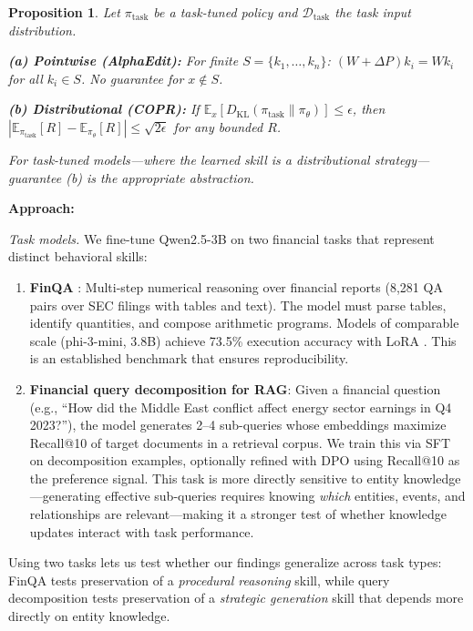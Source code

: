 \documentclass{article}
\newtheorem{proposition}{Proposition}
\begin{document}
\begin{proposition}
Let $\pi_{\text{task}}$ be a task-tuned policy and $\mathcal{D}_{\text{task}}$ the task input distribution.

\textbf{(a) Pointwise (AlphaEdit):} For finite $S = \{k_1, \ldots, k_n\}$: $(W + \Delta P)k_i = Wk_i$ for all $k_i \in S$. No guarantee for $x \notin S$.

\textbf{(b) Distributional (COPR):} If $\mathbb{E}_{x}[D_{\mathrm{KL}}(\pi_{\text{task}} \| \pi_\theta)] \leq \epsilon$, then $|\mathbb{E}_{\pi_{\text{task}}}[R] - \mathbb{E}_{\pi_\theta}[R]| \leq \sqrt{2\epsilon}$ for any bounded $R$.

For task-tuned models---where the learned skill is a distributional strategy---guarantee (b) is the appropriate abstraction.
\end{proposition}

\bigskip

\textbf{Approach:}

\textit{Task models.}
We fine-tune Qwen2.5-3B on two financial tasks that represent distinct behavioral skills:

\begin{enumerate}
    \item \textbf{FinQA} \citep{chen2021finqa}: Multi-step numerical reasoning over financial reports (8,281 QA pairs over SEC filings with tables and text). The model must parse tables, identify quantities, and compose arithmetic programs. Models of comparable scale (phi-3-mini, 3.8B) achieve 73.5\% execution accuracy with LoRA \citep{loukas2024finetuning}. This is an established benchmark that ensures reproducibility.

    \item \textbf{Financial query decomposition for RAG}: Given a financial question (e.g., ``How did the Middle East conflict affect energy sector earnings in Q4 2023?''), the model generates 2--4 sub-queries whose embeddings maximize Recall@10 of target documents in a retrieval corpus. We train this via SFT on decomposition examples, optionally refined with DPO using Recall@10 as the preference signal. This task is more directly sensitive to entity knowledge---generating effective sub-queries requires knowing \emph{which} entities, events, and relationships are relevant---making it a stronger test of whether knowledge updates interact with task performance.
\end{enumerate}

Using two tasks lets us test whether our findings generalize across task types: FinQA tests preservation of a \emph{procedural reasoning} skill, while query decomposition tests preservation of a \emph{strategic generation} skill that depends more directly on entity knowledge.
\end{document}
